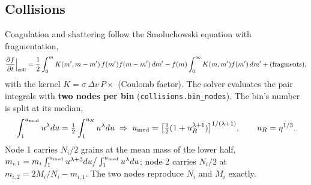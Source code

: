 \documentclass[11pt,a4paper]{article}
\begin{document}
\subsection{Collisions}\label{sec:coll}
Coagulation and shattering follow the Smoluchowski equation with fragmentation,
\begin{equation}
\frac{\partial f}{\partial t}\Big|_{\rm coll} = \frac12\int_0^m K(m',m-m')\,f(m')f(m-m')\,dm'
 - f(m)\int_0^\infty K(m,m')f(m')\,dm' + (\text{fragments}),
\end{equation}
with the kernel $K = \sigma\,\Delta v\,P\times$ (Coulomb factor). The solver evaluates the pair integrals with \textbf{two
nodes per bin} (\texttt{collisions.bin\_nodes}). The bin's number is split at its median,
\begin{equation}
\int_1^{u_{\rm med}} u^\lambda du = \tfrac12\int_1^{u_R}u^\lambda du \;\Rightarrow\;
u_{\rm med} = \big[\tfrac12(1+u_R^{\lambda+1})\big]^{1/(\lambda+1)},\qquad u_R = \eta^{1/3}.
\end{equation}
Node 1 carries $N_i/2$ grains at the mean mass of the lower half,
$m_{i,1} = m_i\int_1^{u_{\rm med}}u^{\lambda+3}du\big/\int_1^{u_{\rm med}}u^{\lambda}du$; node 2 carries $N_i/2$ at
$m_{i,2} = 2M_i/N_i - m_{i,1}$. The two nodes reproduce $N_i$ and $M_i$ exactly.
\end{document}
